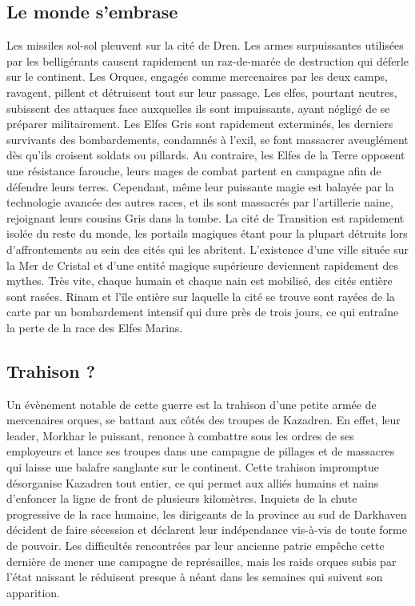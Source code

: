 \subsection{Le monde s'embrase}
Les missiles sol-sol pleuvent sur la cité de Dren. Les armes surpuissantes utilisées par les belligérants causent rapidement un raz-de-marée de destruction qui déferle sur le continent. Les Orques, engagés comme mercenaires par les deux camps, ravagent, pillent et détruisent tout sur leur passage. Les elfes, pourtant neutres, subissent des attaques face auxquelles ils sont impuissants, ayant négligé de se préparer militairement. Les Elfes Gris sont rapidement exterminés, les derniers survivants des bombardements, condamnés à l'exil, se font massacrer aveuglément dès qu'ils croisent soldats ou pillards. Au contraire, les Elfes de la Terre opposent une résistance farouche, leurs mages de combat partent en campagne afin de défendre leurs terres. Cependant, même leur puissante magie est balayée par la technologie avancée des autres races, et ils sont massacrés par l'artillerie naine, rejoignant leurs cousins Gris dans la tombe. 
\newline
La cité de Transition est rapidement isolée du reste du monde, les portails magiques étant pour la plupart détruits lors d'affrontements au sein des cités qui les abritent. L'existence d'une ville située sur la Mer de Cristal et d'une entité magique supérieure deviennent rapidement des mythes.
\newline
Très vite, chaque humain et chaque nain est mobilisé, des cités entière sont rasées. Rinam et l'île entière sur laquelle la cité se trouve sont rayées de la carte par un bombardement intensif qui dure près de trois jours, ce qui entraîne la perte de la race des Elfes Marins. 
\subsection{Trahison ?}
Un évènement notable de cette guerre est la trahison d'une petite armée de mercenaires orques, se battant aux côtés des troupes de Kazadren. En effet, leur leader, Morkhar le puissant, renonce à combattre sous les ordres de ses employeurs et lance ses troupes dans une campagne de pillages et de massacres qui laisse une balafre sanglante sur le continent. Cette trahison impromptue désorganise Kazadren tout entier, ce qui permet aux alliés humains et nains d'enfoncer la ligne de front de plusieurs kilomètres.
\newline
Inquiets de la chute progressive de la race humaine, les dirigeants de la province au sud de Darkhaven décident de faire sécession et déclarent leur indépendance vis-à-vis de toute forme de pouvoir. Les difficultés rencontrées par leur ancienne patrie empêche cette dernière de mener une campagne de représailles, mais les raids orques subis par l'état naissant le réduisent presque à néant dans les semaines qui suivent son apparition.
